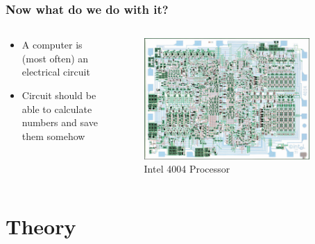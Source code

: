 \documentclass{beamer}
\begin{document}
\begin{frame}\frametitle{Now what do we do with it?}
  \begin{columns}
  \begin{column}{6cm}
  \begin{itemize}
   \item A computer is (most often) an electrical circuit
   \item Circuit should be able to calculate numbers and save them somehow
  \end{itemize}


  \end{column}
  \begin{column}{6cm}
  \begin{figure}
  \includegraphics[width=0.9\textwidth]{4004}
  \caption{Intel 4004 Processor}
  \end{figure}
  \end{column}
  \end{columns}
\end{frame}

\section{Theory}
\frame{\tableofcontents[currentsection]}
\end{document}
